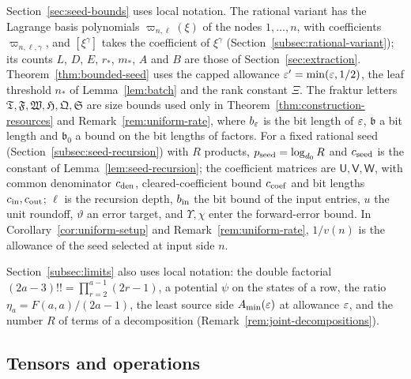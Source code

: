 {Section~\ref{sec:seed-bounds} uses local notation. The rational variant
has the Lagrange basis polynomials \(\varpi_{n,\ell}(\xi)\) of the nodes
\(1,\ldots,n\), with coefficients \(\varpi_{n,\ell,\gamma}\), and
\([\xi^\gamma]\) takes the coefficient of \(\xi^\gamma\)
(Section~\ref{subsec:rational-variant}); its counts \(L\), \(D\), \(E\),
\(r_*\), \(m_*\), \(A\) and \(B\) are those of
Section~\ref{sec:extraction}. Theorem~\ref{thm:bounded-seed}
uses the capped allowance \(\varepsilon'=\min(\varepsilon,1/2)\), the leaf threshold
\(n_*\) of Lemma~\ref{lem:batch} and the rank constant \(\Xi\). The
fraktur letters \(\mathfrak T,\mathfrak F,\mathfrak W,\mathfrak H,
\mathfrak Q,\mathfrak S\) are size bounds used only in
Theorem~\ref{thm:construction-resources} and
Remark~\ref{rem:uniform-rate}, where \(b_\varepsilon\) is the bit length of
\(\varepsilon\), \(\mathfrak b\) a bit length and \(\mathfrak b_0\) a bound on
the bit lengths of factors. For a fixed
rational seed (Section~\ref{subsec:seed-recursion}) with \(R\)
products, \(p_{\rm seed}=\log_{d_0}R\) and \(c_{\rm seed}\) is the
constant of Lemma~\ref{lem:seed-recursion}; the coefficient matrices are
\(\mathsf U,\mathsf V,\mathsf W\), with common denominator
\(c_{\rm den}\), cleared-coefficient bound \(c_{\rm coef}\) and bit
lengths \(c_{\rm in},c_{\rm out}\); \(\ell\) is the recursion depth,
\(b_{\rm in}\) the bit bound of the input entries, \(u\) the unit roundoff,
\(\vartheta\) an error target, and \(\Upsilon,\chi\) enter the forward-error bound.
In Corollary~\ref{cor:uniform-setup} and Remark~\ref{rem:uniform-rate},
\(1/v(n)\) is the allowance of the seed selected at input side \(n\).

Section~\ref{subsec:limits} also uses local notation: the double
factorial \((2a-3)!!=\prod_{r=2}^{a-1}(2r-1)\), a potential \(\psi\) on
the states of a row, the ratio \(\eta_a=F(a,a)/(2a-1)\), the least
source side \(A_{\min}(\varepsilon)\) at allowance \(\varepsilon\), and the number
\(R\) of terms of a decomposition
(Remark~\ref{rem:joint-decompositions}).

\subsection*{Tensors and operations}
\raggedright

}
